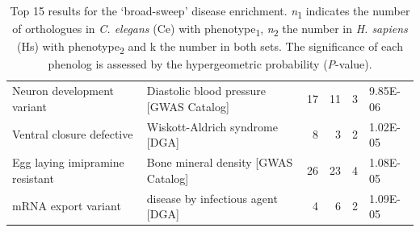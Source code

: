 \begin{table}
\begin{tabulary}{\linewidth}{LLRRRL}
  Neuron development variant & Diastolic blood pressure [GWAS Catalog] & 17 & 11 & 3 & 9.85E-06 \\
  Ventral closure defective & Wiskott-Aldrich syndrome [DGA] & 8 & 3 & 2 & 1.02E-05 \\
  Egg laying imipramine resistant & Bone mineral density [GWAS Catalog] & 26 & 23 & 4 & 1.08E-05 \\
  mRNA export variant & disease by infectious agent [DGA] & 4 & 6 & 2 & 1.09E-05 \\
  \hline
\end{tabulary}
\caption[Top 15 results for the disease enrichment]{Top 15 results for the ‘broad-sweep’ disease enrichment. \textsl{n}\textsubscript{1} indicates the number of orthologues in \textsl{C. elegans} (Ce) with phenotype\textsubscript{1}, \textsl{n}\textsubscript{2} the number in \textsl{H. sapiens} (Hs) with phenotype\textsubscript{2} and k the number in both sets. The significance of each phenolog is assessed by the hypergeometric probability (\textsl{P}-value).}
\label{table:wormqtl_enrichment}
\end{table}

\linespread{1.00} %

